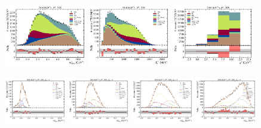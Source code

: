 \begin{figure}[htb]
    \centering
    \includegraphics[width=0.32\textwidth]{./figs-supplemental-plots/pre-ctrl-fit/stacked/fit_result-stacked-D0-2os-mmiss2.pdf}
    \includegraphics[width=0.32\textwidth]{./figs-supplemental-plots/pre-ctrl-fit/stacked/fit_result-stacked-D0-2os-el.pdf}
    \includegraphics[width=0.32\textwidth]{./figs-supplemental-plots/pre-ctrl-fit/stacked/fit_result-stacked-D0-2os-q2.pdf}

    \includegraphics[width=0.24\textwidth]{./figs-supplemental-plots/pre-ctrl-fit/lines_q2_slices/fit_result-lines_q2_idx1-D0-2os-mmiss2.pdf}
    \includegraphics[width=0.24\textwidth]{./figs-supplemental-plots/pre-ctrl-fit/lines_q2_slices/fit_result-lines_q2_idx2-D0-2os-mmiss2.pdf}
    \includegraphics[width=0.24\textwidth]{./figs-supplemental-plots/pre-ctrl-fit/lines_q2_slices/fit_result-lines_q2_idx3-D0-2os-mmiss2.pdf}
    \includegraphics[width=0.24\textwidth]{./figs-supplemental-plots/pre-ctrl-fit/lines_q2_slices/fit_result-lines_q2_idx4-D0-2os-mmiss2.pdf}


\end{figure}
